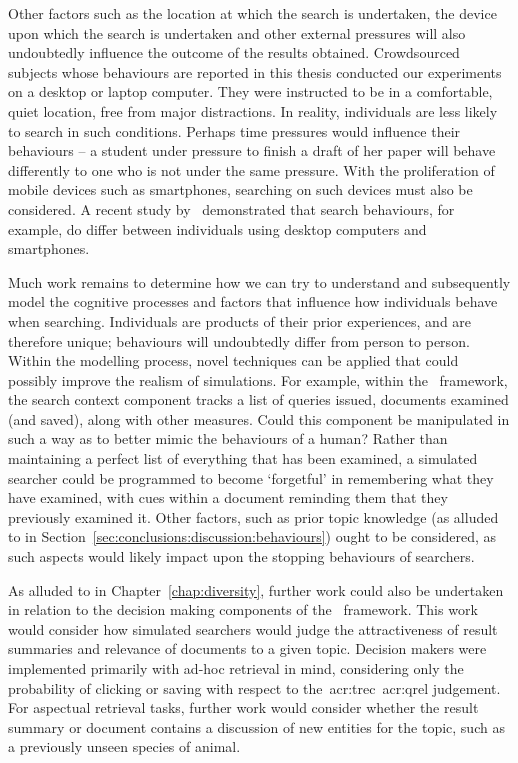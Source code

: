 Other factors such as the location at which the search is undertaken, the device upon which the search is undertaken and other external pressures will also undoubtedly influence the outcome of the results obtained. Crowdsourced subjects whose behaviours are reported in this thesis conducted our experiments on a desktop or laptop computer. They were instructed to be in a comfortable, quiet location, free from major distractions. In reality, individuals are less likely to search in such conditions. Perhaps time pressures would influence their behaviours -- a student under pressure to finish a draft of her paper will behave differently to one who is not under the same pressure. With the proliferation of mobile devices such as smartphones, searching on such devices must also be considered. A recent study by~\cite{ong2017scent_behaviour} demonstrated that search behaviours, for example, do differ between individuals using desktop computers and smartphones.

Much work remains to determine how we can try to understand and subsequently model the cognitive processes and factors that influence how individuals behave when searching. Individuals are products of their prior experiences, and are therefore unique; behaviours will undoubtedly differ from person to person. Within the modelling process, novel techniques can be applied that could possibly improve the realism of simulations. For example, within the \simiir~framework, the search context component tracks a list of queries issued, documents examined (and saved), along with other measures. Could this component be manipulated in such a way as to better mimic the behaviours of a human? Rather than maintaining a perfect list of everything that has been examined, a simulated searcher could be programmed to become `forgetful' in remembering what they have examined, with cues within a document reminding them that they previously examined it. Other factors, such as prior topic knowledge (as alluded to in Section~\ref{sec:conclusions:discussion:behaviours}) ought to be considered, as such aspects would likely impact upon the stopping behaviours of searchers.

As alluded to in Chapter~\ref{chap:diversity}, further work could also be undertaken in relation to the decision making components of the \simiir~framework. This work would consider how simulated searchers would judge the attractiveness of result summaries and relevance of documents to a given topic. Decision makers were implemented primarily with ad-hoc retrieval in mind, considering only the probability of clicking or saving with respect to the~\gls{acr:trec}~\gls{acr:qrel} judgement. For aspectual retrieval tasks, further work would consider whether the result summary or document contains a discussion of new entities for the topic, such as a previously unseen species of animal.


